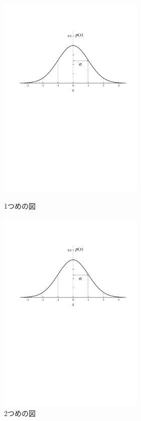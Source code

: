 \documentclass[a4paper,11pt,dvipdfmx]{jarticle}  %
\begin{document}
\begin{figure}[htbp]
 \begin{minipage}{0.5\hsize}
  \begin{center}
   \includegraphics[width=70mm]{gauss001.pdf}
  \end{center}
  \caption{1つめの図}
  \label{fig:one}
 \end{minipage}
 \begin{minipage}{0.5\hsize}
  \begin{center}
   \includegraphics[width=70mm]{gauss001.pdf}
  \end{center}
  \caption{2つめの図}
  \label{fig:two}
 \end{minipage}
\end{figure}
\end{document}
